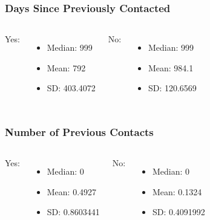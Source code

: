 \documentclass{beamer}
\begin{document}
\begin{frame}
	\frametitle{Days Since Previously Contacted}
	\begin{columns}[c] %
		
    Yes:
		\begin{itemize}
			\item Median: 999
			\item Mean: 792
      \item SD: 403.4072
		\end{itemize}
		
    No:
		\begin{itemize}
			\item Median: 999
			\item Mean: 984.1
      \item SD: 120.6569
		\end{itemize}
		
	\end{columns}
\end{frame}

\begin{frame}
	\frametitle{Number of Previous Contacts}
	\begin{columns}[c] %
		
    Yes:
		\begin{itemize}
			\item Median: 0
			\item Mean: 0.4927
      \item SD: 0.8603441
		\end{itemize}
		
    No:
		\begin{itemize}
			\item Median: 0
			\item Mean: 0.1324
      \item SD: 0.4091992
		\end{itemize}
		
	\end{columns}
\end{frame}
\end{document}
